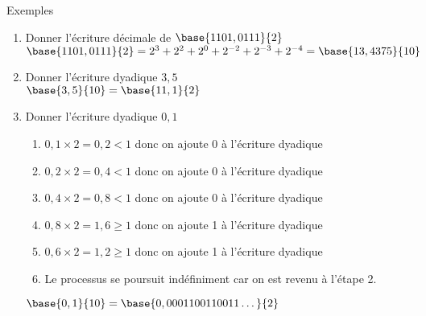 \documentclass[10pt,french]{beamer}
\begin{document}
\begin{frame}{\Ctitle}{\stitle}
	\begin{exampleblock}{Exemples}
		\begin{enumerate}
			\item<1-> Donner l'écriture décimale de $\base{1101,0111}{2}$ \\
				\onslide<2-> \textcolor{OliveGreen}{$\base{1101,0111}{2} = 2^3+2^2+2^0+2^{-2}+2^{-3}+2^{-4} = \base{13,4375}{10}$}
			\item<3-> Donner l'écriture dyadique $3,5$\\
				\onslide<4-> \textcolor{OliveGreen}{$\base{3,5}{10}=\base{11,1}{2}$}
			\item<5-> Donner l'écriture dyadique $0,1$
				\onslide<6->
				\begin{enumerate}
					\item<7-> \textcolor{OliveGreen}{$0,1 \times 2 = 0,2 < 1$ donc on ajoute 0 à l'écriture dyadique }
					\item<8-> \textcolor{OliveGreen}{$0,2 \times 2 = 0,4 < 1$ donc on ajoute 0 à l'écriture dyadique}
					\item<9-> \textcolor{OliveGreen}{$0,4 \times 2 = 0,8 < 1$ donc on ajoute 0 à l'écriture dyadique}
						\item<10->\textcolor{OliveGreen}{$0,8 \times 2 = 1,6 \geq 1$ donc on ajoute 1 à l'écriture dyadique}
						\item<11->\textcolor{OliveGreen}{$0,6 \times 2 = 1,2 \geq 1$  donc on ajoute 1 à l'écriture dyadique}
						\item<12->\textcolor{OliveGreen}{Le processus se poursuit indéfiniment car on est revenu à l'étape 2.}
				\end{enumerate}
				\textcolor{OliveGreen}{$\base{0,1}{10} = \base{0,0001100110011\dots}{2}$}
		\end{enumerate}

	\end{exampleblock}
\end{frame}
\end{document}
